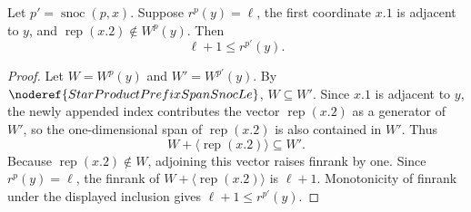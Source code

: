 \begin{lemma}
Let \(p'=\operatorname{snoc}(p,x)\).  Suppose \(r^p(y)=\ell\), the first
coordinate \(x.1\) is adjacent to \(y\), and
\(\operatorname{rep}(x.2)\notin W^p(y)\).  Then
\[
  \ell+1\le r^{p'}(y).
\]
\end{lemma}
\begin{proof}
Let \(W=W^p(y)\) and \(W'=W^{p'}(y)\).  By
\(\noderef{StarProductPrefixSpanSnocLe}\), \(W\subseteq W'\).  Since
\(x.1\) is adjacent to \(y\), the newly appended index contributes the vector
\(\operatorname{rep}(x.2)\) as a generator of \(W'\), so the one-dimensional
span of \(\operatorname{rep}(x.2)\) is also contained in \(W'\).  Thus
\[
  W+\langle\operatorname{rep}(x.2)\rangle\subseteq W'.
\]
Because \(\operatorname{rep}(x.2)\notin W\), adjoining this vector raises
finrank by one.  Since \(r^p(y)=\ell\), the finrank of
\(W+\langle\operatorname{rep}(x.2)\rangle\) is \(\ell+1\).  Monotonicity of
finrank under the displayed inclusion gives \(\ell+1\le r^{p'}(y)\).
\end{proof}
